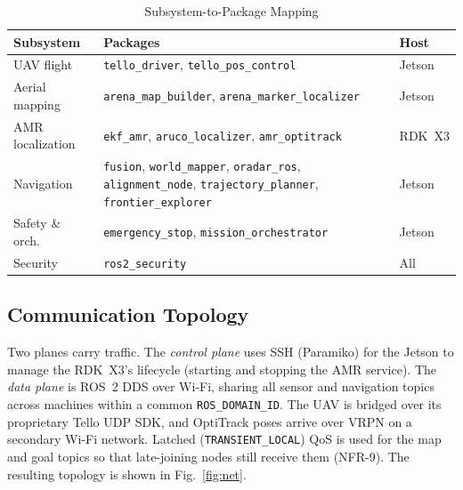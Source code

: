 \documentclass[conference]{IEEEtran}
\newcommand{\subsys}[1]{\texttt{#1}}      %
\begin{document}
\begin{table}[t]
\caption{Subsystem-to-Package Mapping}
\label{tab:subsystems}
\centering
\begin{tabular}{@{}p{}p{}p{}@{}}
\toprule
\textbf{Subsystem} & \textbf{Packages} & \textbf{Host} \\
\midrule
UAV flight        & \subsys{tello\_driver}, \subsys{tello\_pos\_control} & Jetson \\
Aerial mapping    & \subsys{arena\_map\_builder}, \subsys{arena\_marker\_localizer} & Jetson \\
AMR localization  & \subsys{ekf\_amr}, \subsys{aruco\_localizer}, \subsys{amr\_optitrack} & RDK~X3 \\
Navigation        & \subsys{fusion}, \subsys{world\_mapper}, \subsys{oradar\_ros}, \subsys{alignment\_node}, \subsys{trajectory\_planner}, \subsys{frontier\_explorer} & Jetson \\
Safety \& orch.   & \subsys{emergency\_stop}, \subsys{mission\_orchestrator} & Jetson \\
Security          & \subsys{ros2\_security} & All \\
\bottomrule
\end{tabular}
\end{table}

\subsection{Communication Topology}
Two planes carry traffic. The \emph{control plane} uses SSH (Paramiko) for the
Jetson to manage the RDK~X3's lifecycle (starting and stopping the AMR service).
The \emph{data plane} is ROS~2 DDS over Wi-Fi, sharing all sensor and navigation
topics across machines within a common \texttt{ROS\_DOMAIN\_ID}. The UAV is
bridged over its proprietary Tello UDP SDK, and OptiTrack poses arrive over VRPN
on a secondary Wi-Fi network. Latched (\texttt{TRANSIENT\_LOCAL}) QoS is used for the map and
goal topics so that late-joining nodes still receive them (NFR-9). The resulting
topology is shown in Fig.~\ref{fig:net}.
\end{document}
